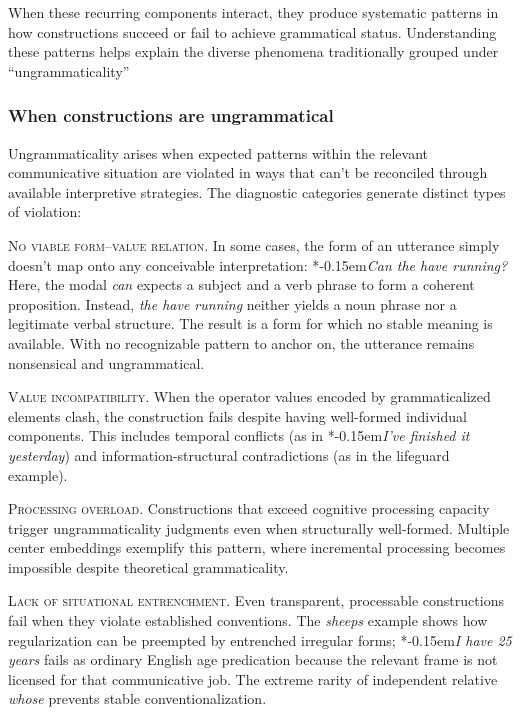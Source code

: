 \documentclass[12pt,letterpaper]{article}
\newcommand{\mention}[1]{\textit{#1}}
\newcommand{\judgesep}{\kern-0.15em}
\newcommand{\ungram}[1]{*\judgesep#1}
\begin{document}
When these recurring components interact, they produce systematic patterns in how constructions succeed or fail to achieve grammatical status. Understanding these patterns helps explain the diverse phenomena traditionally grouped under \enquote{ungrammaticality}

\subsubsection{When constructions are ungrammatical}\label{sec:ungrammatical}

Ungrammaticality arises when expected patterns within the relevant communicative situation are violated in ways that can't be reconciled through available interpretive strategies. The diagnostic categories generate distinct types of violation:

\textsc{No viable form--value relation.}
In some cases, the form of an utterance simply doesn't map onto any conceivable interpretation:
\ea\label{ex:running-pattern}\ungram{\mention{Can the have running?}}
\z
Here, the modal \mention{can} expects a subject and a verb phrase to form a coherent proposition. Instead, \mention{the have running} neither yields a noun phrase nor a legitimate verbal structure. The result is a form for which no stable meaning is available. With no recognizable pattern to anchor on, the utterance remains nonsensical and ungrammatical.

\textsc{Value incompatibility.}
When the operator values encoded by grammaticalized elements clash, the construction fails despite having well-formed individual components. This includes temporal conflicts (as in \ungram{\mention{I've finished it yesterday}}) and information-structural contradictions (as in the lifeguard example).

\textsc{Processing overload.}\label{sec:processing}
Constructions that exceed cognitive processing capacity trigger ungrammaticality judgments even when structurally well-formed. Multiple center embeddings exemplify this pattern, where incremental processing becomes impossible despite theoretical grammaticality.

\textsc{Lack of situational entrenchment.}
Even transparent, processable constructions fail when they violate established conventions. The \mention{sheeps} example shows how regularization can be preempted by entrenched irregular forms; \ungram{\mention{I have 25 years}} fails as ordinary English age predication because the relevant frame is not licensed for that communicative job. The extreme rarity of independent relative \mention{whose} prevents stable conventionalization.
\end{document}
